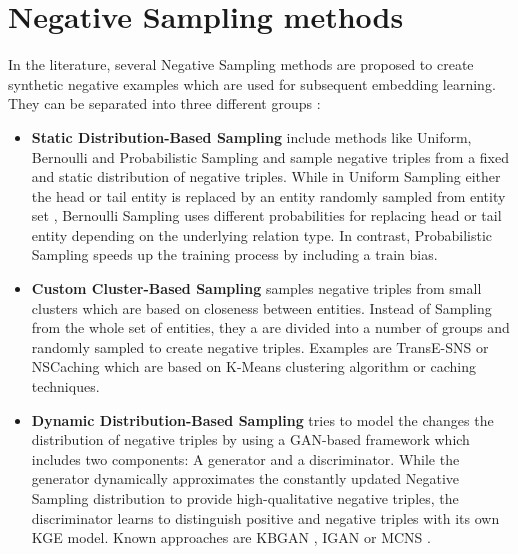 \section{Negative Sampling methods} \label{sec:negativesamplingmethods}
In the literature, several Negative Sampling methods are proposed to create synthetic negative examples which are used for subsequent embedding learning.
They can be separated into three different groups \cite{qianunderstanding}:
\begin{itemize}
    \item 
    \textbf{Static Distribution-Based Sampling} include methods like Uniform, Bernoulli and Probabilistic Sampling and sample negative triples from a fixed and static distribution of negative triples.
	While in Uniform Sampling either the head or tail entity is replaced by an entity randomly sampled from entity set \entities,
	Bernoulli Sampling uses different probabilities for replacing head or tail entity depending on the underlying relation type.
	In contrast, Probabilistic Sampling speeds up the training process by including a train bias.
	
	\item 
    \textbf{Custom Cluster-Based Sampling} samples negative triples from small clusters which are based on closeness between entities.
    Instead of Sampling from the whole set of entities, they a are divided into a number of groups and randomly sampled to create negative triples.	
	Examples are TransE-\ac{SNS} \cite{TransE-SNS} or \ac{NSCaching} \cite{zhang2019nscaching} which are based on K-Means clustering algorithm or caching techniques. 
    
    \item 
    \textbf{Dynamic Distribution-Based Sampling} tries to model the changes the distribution of negative triples by using a \ac{GAN}-based framework which includes two components: A generator and a discriminator.
	While the generator dynamically approximates the constantly updated Negative Sampling distribution to provide high-qualitative negative triples, 
	the discriminator learns to distinguish positive and negative triples with its own \ac{KGE} model.
	Known approaches are \ac{KBGAN} \cite{cai2017kbgan}, \ac{IGAN}  \cite{IGAN} or \ac{MCNS} \cite{MCNS}.
\end{itemize}


